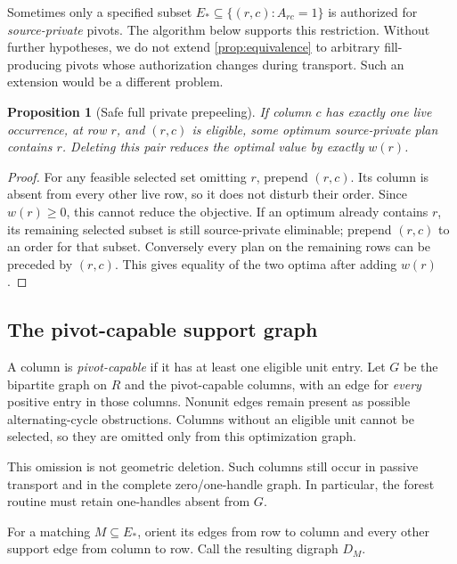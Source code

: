\documentclass[11pt,letterpaper]{article}
\newtheorem{proposition}[proposition]{Proposition}\aliascntresetthe{proposition}
\theoremstyle{definition}
\theoremstyle{remark}
\begin{document}
Sometimes only a specified subset $E_*\subseteq\{(r,c):A_{rc}=1\}$ is authorized for \emph{source-private} pivots. The algorithm below supports this restriction. Without further hypotheses, we do not extend \cref{prop:equivalence} to arbitrary fill-producing pivots whose authorization changes during transport. Such an extension would be a different problem.

\begin{proposition}[Safe full private prepeeling]
\label{prop:prepeel}
If column $c$ has exactly one live occurrence, at row $r$, and $(r,c)$ is eligible, some optimum source-private plan contains $r$. Deleting this pair reduces the optimal value by exactly $w(r)$.
\end{proposition}
\begin{proof}
For any feasible selected set omitting $r$, prepend $(r,c)$. Its column is absent from every other live row, so it does not disturb their order. Since $w(r)\ge0$, this cannot reduce the objective. If an optimum already contains $r$, its remaining selected subset is still source-private eliminable; prepend $(r,c)$ to an order for that subset. Conversely every plan on the remaining rows can be preceded by $(r,c)$. This gives equality of the two optima after adding $w(r)$.
\end{proof}

\subsection{The pivot-capable support graph}
A column is \emph{pivot-capable} if it has at least one eligible unit entry. Let $G$ be the bipartite graph on $R$ and the pivot-capable columns, with an edge for \emph{every} positive entry in those columns. Nonunit edges remain present as possible alternating-cycle obstructions. Columns without an eligible unit cannot be selected, so they are omitted only from this optimization graph.

This omission is not geometric deletion. Such columns still occur in passive transport and in the complete zero/one-handle graph. In particular, the forest routine must retain one-handles absent from $G$.

For a matching $M\subseteq E_*$, orient its edges from row to column and every other support edge from column to row. Call the resulting digraph $D_M$.
\end{document}
